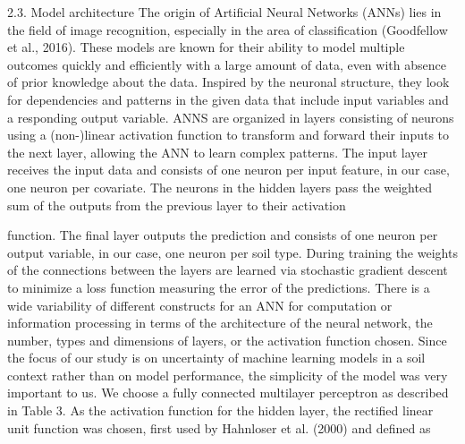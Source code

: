 2.3. Model architecture
The origin of Artificial Neural Networks (ANNs) lies in the field of
image recognition, especially in the area of classification (Goodfellow
et al., 2016). These models are known for their ability to model multiple
outcomes quickly and efficiently with a large amount of data, even with
absence of prior knowledge about the data. Inspired by the neuronal
structure, they look for dependencies and patterns in the given data that
include input variables and a responding output variable. ANNS are
organized in layers consisting of neurons using a (non-)linear activation
function to transform and forward their inputs to the next layer,
allowing the ANN to learn complex patterns. The input layer receives the
input data and consists of one neuron per input feature, in our case, one
neuron per covariate. The neurons in the hidden layers pass the
weighted sum of the outputs from the previous layer to their activation




function. The final layer outputs the prediction and consists of one
neuron per output variable, in our case, one neuron per soil type. During
training the weights of the connections between the layers are learned
via stochastic gradient descent to minimize a loss function measuring
the error of the predictions. There is a wide variability of different
constructs for an ANN for computation or information processing in
terms of the architecture of the neural network, the number, types and
dimensions of layers, or the activation function chosen. Since the focus
of our study is on uncertainty of machine learning models in a soil
context rather than on model performance, the simplicity of the model
was very important to us. We choose a fully connected multilayer perceptron
as described in Table 3. As the activation function for the hidden
layer, the rectified linear unit function was chosen, first used by Hahnloser
et al. (2000) and defined as 


